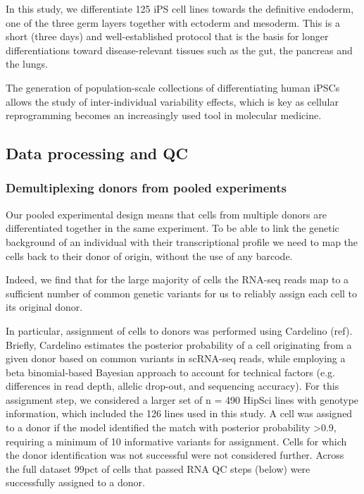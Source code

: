 In this study, we differentiate 125 iPS cell lines towards the definitive endoderm, one of the three germ layers together with ectoderm and mesoderm. This is a short (three days) and well-established protocol that is the basis for longer differentiations toward disease-relevant tissues such as the gut, the pancreas and the lungs.

The generation of population-scale collections of differentiating human iPSCs allows the study of inter-individual variability effects, which is key as cellular reprogramming becomes an increasingly used tool in molecular medicine.


\subsection{Data processing and QC}


\subsubsection{Demultiplexing donors from pooled experiments} 

Our pooled experimental design means that cells from multiple donors are differentiated together in the same experiment. To be able to link the genetic background of an individual with their transcriptional profile we need to map the cells back to their donor of origin, without the use of any barcode.

Indeed, we find that for the large majority of cells the RNA-seq reads map to a sufficient number of common genetic variants for us to reliably assign each cell to its original donor.

In particular, assignment of cells to donors was performed using Cardelino (ref). Briefly, Cardelino estimates the posterior probability of a cell originating from a given donor based on common variants in scRNA-seq reads, while employing a beta binomial-based Bayesian approach to account for technical factors (e.g. differences in read depth, allelic drop-out, and sequencing accuracy). For this assignment step, we considered a larger set of n = 490 HipSci lines with genotype information, which included the 126 lines used in this study. A cell was assigned to a donor if the model identified the match with posterior probability >0.9, requiring a minimum of 10 informative variants for assignment. Cells for which the donor identification was not successful were not considered further. Across the full dataset 99pct of cells that passed RNA QC steps (below) were successfully assigned to a donor.

